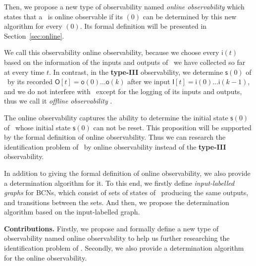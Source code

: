Then, we propose a new type of observability named {\em online observability} which states that a \BCN\ is online observable if its \State$(0)$ can be determined by this new algorithm for every \State$(0)$. Its formal definition will be presented in Section~\ref{sec:online}.  

We call this observability online observability, because we choose every $\mathsf{i}(t)$ based on the information of the inputs and outputs of \BCN\ we have collected so far at every time $t$. In contrast, in the {\bf type-III} observability, we determine $\mathsf{s}(0)$ of \BCN\ by its recorded $\mathsf{O}[t]=\mathsf{o}(0)\ldots\mathsf{o}(k)$ after we input $\mathsf{I}[t]=\mathsf{i}(0)\ldots\mathsf{i}(k-1)$, and  we do not interfere with \BCN\ except for the logging of its inputs and outputs, thus we call it {\em offline observability} \cite{Cassar2017A}.
 
The online observability captures the ability to determine the initial state $\mathsf{s}(0)$ of \BCN\ whose initial state $\mathsf{s}(0)$ can not be reset. This proposition will be supported by the formal definition of  online observability.  Thus we can research the identification problem of \BCNs\ by online observability instead of the {\bf type-III} observability.




In addition to giving the formal definition of online observability, we also provide a determination algorithm for it. To this end, we firstly define {\em input-labelled graphs} for BCNs, which consist of sets of states of \BCNs\ producing the same outputs, and transitions between the sets. And then, we propose the determination algorithm based on the input-labelled graph.


\medskip\noindent
{\bf Contributions.}
Firstly, we propose and formally define a new type of observability named online observability to help us further researching the identification problem of \BCNs. %
Secondly, we also provide a determination algorithm for the online observability. %

